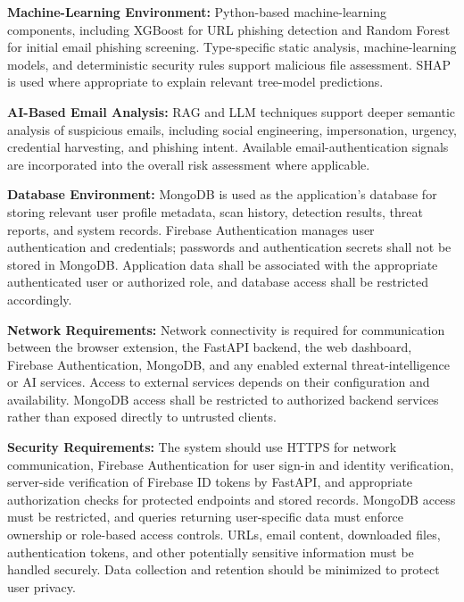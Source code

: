 \documentclass[12pt,a4paper]{report}
\begin{document}
\textbf{Machine-Learning Environment:} Python-based machine-learning components, including XGBoost for URL phishing detection and Random Forest for initial email phishing screening. Type-specific static analysis, machine-learning models, and deterministic security rules support malicious file assessment. SHAP is used where appropriate to explain relevant tree-model predictions.\par

\textbf{AI-Based Email Analysis:} RAG and LLM techniques support deeper semantic analysis of suspicious emails, including social engineering, impersonation, urgency, credential harvesting, and phishing intent. Available email-authentication signals are incorporated into the overall risk assessment where applicable.\par

\textbf{Database Environment:} MongoDB is used as the application's database for storing relevant user profile metadata, scan history, detection results, threat reports, and system records. Firebase Authentication manages user authentication and credentials; passwords and authentication secrets shall not be stored in MongoDB. Application data shall be associated with the appropriate authenticated user or authorized role, and database access shall be restricted accordingly.\par

\textbf{Network Requirements:} Network connectivity is required for communication between the browser extension, the FastAPI backend, the web dashboard, Firebase Authentication, MongoDB, and any enabled external threat-intelligence or AI services. Access to external services depends on their configuration and availability. MongoDB access shall be restricted to authorized backend services rather than exposed directly to untrusted clients.\par

\textbf{Security Requirements:} The system should use HTTPS for network communication, Firebase Authentication for user sign-in and identity verification, server-side verification of Firebase ID tokens by FastAPI, and appropriate authorization checks for protected endpoints and stored records. MongoDB access must be restricted, and queries returning user-specific data must enforce ownership or role-based access controls. URLs, email content, downloaded files, authentication tokens, and other potentially sensitive information must be handled securely. Data collection and retention should be minimized to protect user privacy.\par
\end{document}
